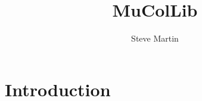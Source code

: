 \documentclass[10pt,a4paper,final,twoside,titlepage]{article}
\author{Steve Martin}
\title{MuColLib}
\begin{document}
\maketitle
\tableofcontents
\newpage
\section{Introduction}
\label{intro}
\end{document}
